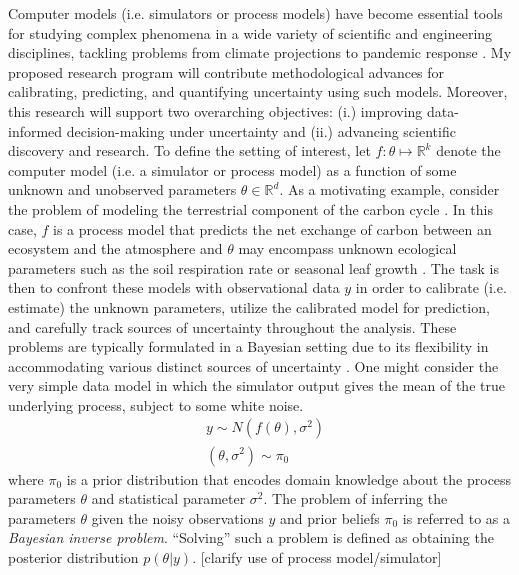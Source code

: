 \documentclass[12pt]{article}
\newcommand{\R}{\mathcal{R}}
\def\R{\mathbb{R}}
\begin{document}
Computer models (i.e. simulators or process models) have become essential tools for studying complex phenomena in a wide variety of scientific and engineering disciplines, 
tackling problems from climate projections \cite{Canadell} to pandemic response \cite{Swallow}. My proposed research program will contribute methodological 
advances for calibrating, predicting, and quantifying uncertainty using such models. Moreover, this research will support two 
overarching objectives: (i.) improving data-informed decision-making under uncertainty and (ii.) advancing scientific discovery and research. To define the 
setting of interest, let $f: \theta \mapsto \R^k$ denote the computer model (i.e. a simulator or process model) as a function of some unknown and unobserved
parameters $\theta \in \R^d$. As a motivating example, consider the problem of modeling the terrestrial component of the carbon cycle \cite{Friedlingstein}. 
In this case, $f$ is a process model that predicts the net exchange of carbon between an ecosystem and the atmosphere \cite{Waring} and $\theta$ may encompass 
unknown ecological parameters such as the soil respiration rate or seasonal leaf growth \cite{Fer}. The task is then to confront these models with observational data $y$ in 
order to calibrate (i.e. estimate) the unknown parameters, utilize the calibrated model for prediction, and carefully track sources of uncertainty throughout the analysis. These problems are typically formulated in a Bayesian setting due to its flexibility in accommodating various distinct sources of uncertainty \cite{Kennedy, Clark}. One might consider the very simple data model in which the simulator output gives the mean of the true underlying process, subject
to some white noise.   
\begin{align*}
&y \sim N(f(\theta), \sigma^2) \\
&(\theta, \sigma^2) \sim \pi_0
\end{align*}
where $\pi_0$ is a prior distribution that encodes domain knowledge about the process parameters $\theta$ and statistical parameter $\sigma^2$.
The problem of inferring the parameters $\theta$ given the noisy observations $y$ and prior beliefs $\pi_0$ is referred to as a \textit{Bayesian inverse problem}. ``Solving'' such a problem is defined as obtaining the posterior distribution $p(\theta|y)$.  
[clarify use of process model/simulator]
\end{document}
